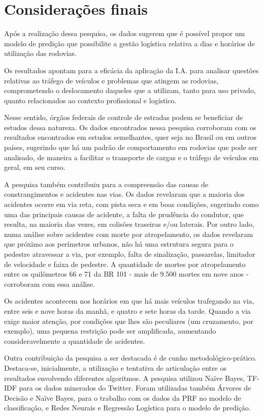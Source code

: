 \chapter{Considerações finais}\label{intro:resumen}

Após a realização dessa pesquisa, os dados sugerem que é possível propor um modelo de predição que possibilite a gestão logística relativa a dias e horários de utilização das rodovias.  

Os resultados apontam para a eficácia da aplicação da
I.A. para analisar questões relativas ao tráfego de veículos e problemas que atingem as rodovias, comprometendo o deslocamento daqueles que a utilizam, tanto para uso privado, quanto relacionados ao contexto profissional e logístico. 

Nesse sentido, órgãos federais de controle de estradas podem se beneficiar de estudos dessa natureza. 
Os dados encontrados nessa pesquisa corroboram com os resultados encontrados em estudos semelhantes, quer seja no Brasil ou em outros países, sugerindo que há um padrão de comportamento em rodovias que pode ser analisado, de maneira a facilitar o transporte de cargas e o tráfego de veículos em geral, em seu curso. 

A pesquisa também contribuiu para a compreensão das causas de constrangimentos e acidentes nas vias. Os dados revelaram que a maioria dos acidentes ocorre em via reta, com pista seca e em boas condições, sugerindo como uma das principais causas de acidente, a falta de prudência do condutor, que resulta, na maioria das vezes, em colisões traseiras e/ou laterais. Por outro lado, numa análise sobre acidentes com morte por atropelamento, os dados revelaram que próximo aos perímetros urbanos, não há uma estrutura segura para o pedestre atravessar a via, por exemplo, falta de sinalização, passarelas, limitador de velocidade e faixa de pedestre. A quantidade de mortes por atropelamento entre os quilômetros 66 e 71 da BR 101 - mais de 9.500 mortes em nove anos - corroboram com essa análise.

Os acidentes acontecem nos horários em que há mais veículos trafegando na via, entre seis e nove horas da manhã, e quatro e sete horas da tarde. Quando a via exige maior atenção, por condições que lhes são peculiares (um cruzamento, por exemplo), uma pequena restrição pode ser amplificada, aumentando consideravelmente a quantidade de acidentes.

Outra contribuição da pesquisa a ser destacada é de cunho metodológico-prático. Destaca-se, inicialmente, a utilização e tentativa de articulação entre os resultados envolvendo diferentes algoritmos.
A pesquisa utilizou Naïve Bayes, TF-IDF para os dados minerados do Twitter. 
Foram utilizadas também Árvores de Decisão e  Naïve Bayes, para o trabalho com os dados da PRF no modelo de classificação, e   Redes Neurais e Regressão Logística para o modelo de predição.  

